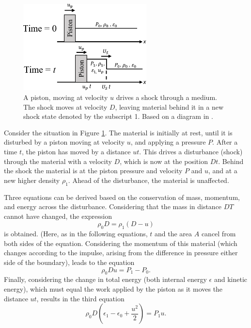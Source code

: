 \begin{figure}
\centering
\includegraphics[width=0.6\textwidth]{figures/Theory/Piston.pdf}%
\caption{\label{fig:Piston} A piston, moving at velocity $u$ drives a shock through a medium. The shock moves at velocity $D$, leaving material behind it in a new shock state denoted by the subscript 1. Based on a diagram in \cite{Zeldovich1966}.}
\end{figure}

Consider the situation in Figure \ref{fig:Piston}. The material is initially at rest, until it is disturbed by a piston moving at velocity $u$, and applying a pressure $P$. After a time $t$, the piston has moved by a distance $ut$. This drives a disturbance (shock) through the material with a velocity $D$, which is now at the position $Dt$. Behind the shock the material is at the piston pressure and velocity $P$ and $u$, and at a new higher density $\rho_1$. Ahead of the disturbance, the material is unaffected.

Three equations can be derived based on the conservation of mass, momentum, and energy across the disturbance. Considering that the mass in distance $DT$ cannot have changed, the expression
\begin{equation} \rho_0 D = \rho_1 (D-u) \end{equation}
is obtained. (Here, as in the following equations, $t$ and the area $A$ cancel from both sides of the equation. Considering the momentum of this material (which changes according to the impulse, arising from the difference in pressure either side of the boundary), leads to the equation 
\begin{equation} \rho_0 D u = P_1 - P_0. \end{equation}
Finally, considering the change in total energy (both internal energy $\epsilon$ and kinetic energy), which must equal the work applied by the piston as it moves the distance $ut$, results in the third equation 
\begin{equation} \rho_0 D (\epsilon_1 - \epsilon_0 + \frac{u^2}{2}) = P_1 u. \end{equation}

